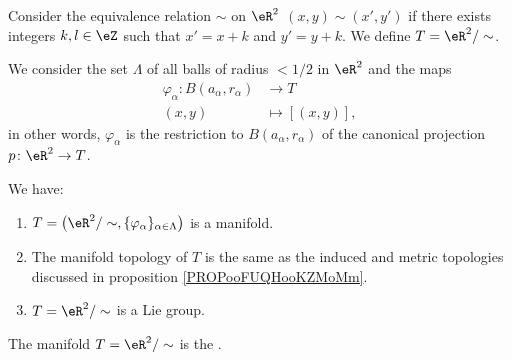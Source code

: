 \begin{proposition}[\( 2\)-torus]       \label{PROPooSBVCooOZnszF}
	Consider the equivalence relation \( \sim\) on \( \eR^2\) \( (x,y)\sim(x',y')\) if there exists integers \( k,l\in \eZ\) such that \( x'=x+k\) and \( y'=y+k\). We define \( T=\eR^2/\sim\).

	We consider the set \( \Lambda\) of all balls of radius \( <1/2\) in \( \eR^2\) and the maps
	\begin{equation}
		\begin{aligned}
			\varphi_{\alpha}\colon B(a_{\alpha},r_{\alpha}) & \to T            \\
			(x,y)                                           & \mapsto [(x,y)],
		\end{aligned}
	\end{equation}
	in other words, \( \varphi_{\alpha}\) is the restriction to \( B(a_{\alpha}, r_{\alpha}) \) of the canonical projection \(p \colon \eR^2\to T  \).

	We have:
	\begin{enumerate}
		\item
		      \( T= \big( \eR^2/\sim,\{ \varphi_{\alpha} \}_{\alpha\in \Lambda} \big)\) is a manifold.
		\item
		      The manifold topology of \( T\) is the same as the induced and metric topologies discussed in proposition \ref{PROPooFUQHooKZMoMm}.
		\item
		      \(T= \eR^2/\sim\) is a Lie group.
	\end{enumerate}
	The manifold \(T= \eR^2/\sim\) is the .
\end{proposition}

